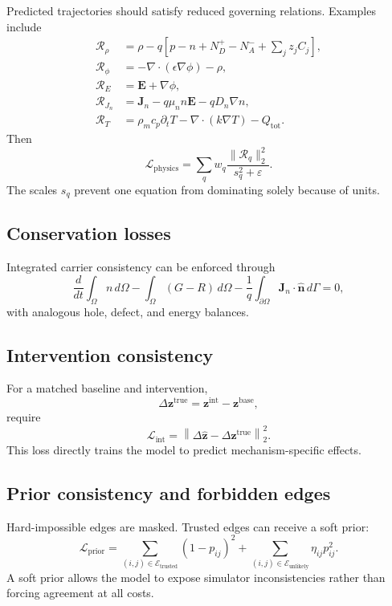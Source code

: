 \documentclass[11pt]{article}
\newcommand{\Ecal}{\mathcal{E}}
\newcommand{\Rcal}{\mathcal{R}}
\newcommand{\zvec}{\bm{z}}
\newcommand{\Evec}{\bm{E}}
\newcommand{\Jvec}{\bm{J}}
\newcommand{\eps}{\varepsilon}
\newcommand{\Lphysics}{\mathcal{L}_{\mathrm{physics}}}
\newcommand{\Lprior}{\mathcal{L}_{\mathrm{prior}}}
\newcommand{\Lint}{\mathcal{L}_{\mathrm{int}}}
\begin{document}
Predicted trajectories should satisfy reduced governing relations. Examples include
\begin{align}
\Rcal_{\rho}&=\rho-q\left[p-n+N_D^+-N_A^-+\sum_jz_jC_j\right],\\
\Rcal_{\phi}&=-\nabla\cdot(\epsilon\nabla\phi)-\rho,\\
\Rcal_E&=\Evec+\nabla\phi,\\
\Rcal_{J_n}&=\Jvec_n-q\mu_n n\Evec-qD_n\nabla n,\\
\Rcal_T&=\rho_mc_p\partial_tT-\nabla\cdot(k\nabla T)-Q_{\mathrm{tot}}.
\end{align}
Then
\begin{equation}
\Lphysics=\sum_q w_q\frac{\|\Rcal_q\|_2^2}{s_q^2+\eps}.
\end{equation}
The scales \(s_q\) prevent one equation from dominating solely because of units.

\subsection{Conservation losses}

Integrated carrier consistency can be enforced through
\begin{equation}
\frac{d}{dt}\int_\Omega n\,d\Omega
-\int_\Omega(G-R)\,d\Omega
-\frac{1}{q}\int_{\partial\Omega}\Jvec_n\cdot\hat{\bm n}\,d\Gamma=0,
\end{equation}
with analogous hole, defect, and energy balances.

\subsection{Intervention consistency}

For a matched baseline and intervention,
\begin{equation}
\Delta\zvec^{\mathrm{true}}=\zvec^{\mathrm{int}}-\zvec^{\mathrm{base}},
\end{equation}
require
\begin{equation}
\Lint=\left\|\Delta\widehat{\zvec}-\Delta\zvec^{\mathrm{true}}\right\|_2^2.
\end{equation}
This loss directly trains the model to predict mechanism-specific effects.

\subsection{Prior consistency and forbidden edges}

Hard-impossible edges are masked. Trusted edges can receive a soft prior:
\begin{equation}
\Lprior=\sum_{(i,j)\in\Ecal_{\mathrm{trusted}}}(1-p_{ij})^2
+\sum_{(i,j)\in\Ecal_{\mathrm{unlikely}}}\eta_{ij}p_{ij}^2.
\end{equation}
A soft prior allows the model to expose simulator inconsistencies rather than forcing agreement at all costs.
\end{document}
